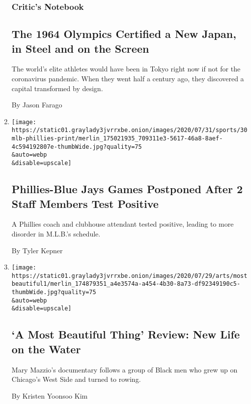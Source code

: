 \begin{enumerate}
  \hypertarget{critics-notebook}{%
  \subsubsection{Critic's Notebook}\label{critics-notebook}}

  \hypertarget{the-1964-olympics-certified-a-new-japan-in-steel-and-on-the-screen}{%
  \subsection{The 1964 Olympics Certified a New Japan, in Steel and on
  the
  Screen}\label{the-1964-olympics-certified-a-new-japan-in-steel-and-on-the-screen}}

  The world's elite athletes would have been in Tokyo right now if not
  for the coronavirus pandemic. When they went half a century ago, they
  discovered a capital transformed by design.

  By Jason Farago
\item
  \href{/2020/07/30/sports/baseball/phillies-blue-jays-postponed-coronavirus.html}{}

  \texttt{[image: https://static01.graylady3jvrrxbe.onion/images/2020/07/31/sports/30mlb-phillies-print/merlin\_175021935\_709311e3-5617-46a8-8aef-4c594192807e-thumbWide.jpg?quality=75\\\&auto=webp\\\&disable=upscale]}

  \hypertarget{phillies-blue-jays-games-postponed-after-2-staff-members-test-positive}{%
  \subsection{Phillies-Blue Jays Games Postponed After 2 Staff Members
  Test
  Positive}\label{phillies-blue-jays-games-postponed-after-2-staff-members-test-positive}}

  A Phillies coach and clubhouse attendant tested positive, leading to
  more disorder in M.L.B.'s schedule.

  By Tyler Kepner
\item
  \href{/2020/07/30/movies/a-most-beautiful-thing-review.html}{}

  \texttt{[image: https://static01.graylady3jvrrxbe.onion/images/2020/07/29/arts/mostbeautiful1/merlin\_174879351\_a4e3574a-a454-4b30-8a73-df92349190c5-thumbWide.jpg?quality=75\\\&auto=webp\\\&disable=upscale]}

  \hypertarget{a-most-beautiful-thing-review-new-life-on-the-water}{%
  \subsection{`A Most Beautiful Thing' Review: New Life on the
  Water}\label{a-most-beautiful-thing-review-new-life-on-the-water}}

  Mary Mazzio's documentary follows a group of Black men who grew up on
  Chicago's West Side and turned to rowing.

  By Kristen Yoonsoo Kim
\end{enumerate}

